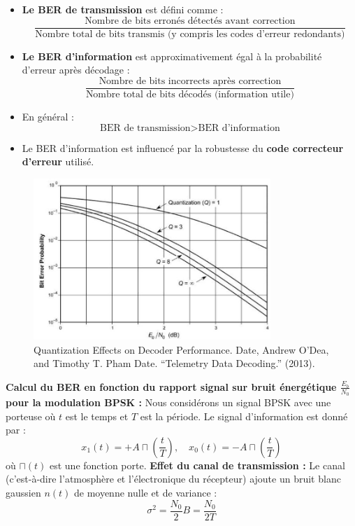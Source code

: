 \begin{itemize}
    \item \textbf{Le BER de transmission} est défini comme :
    \[
    \frac{\text{Nombre de bits erronés détectés avant correction}}{\text{Nombre total de bits transmis (y compris les codes d'erreur redondants)}}
    \]
    \item \textbf{Le BER d'information} est approximativement égal à la probabilité d'erreur après décodage :
    \[
    \frac{\text{Nombre de bits incorrects après correction}}{\text{Nombre total de bits décodés (information utile)}}
    \]
    \item En général :
    \[
    \text{BER de transmission} > \text{BER d'information}
    \]
    \item Le BER d'information est influencé par la robustesse du \textbf{code correcteur d'erreur} utilisé.
\end{itemize}
\begin{figure}[H] %
    \centering
    \includegraphics[width=0.8\textwidth]{figures/6-48.jpg}
    \caption{Quantization Effects on Decoder Performance. Date, Andrew O’Dea, and Timothy T. Pham Date. “Telemetry Data Decoding.” (2013).}
    \label{fig:communication2}
\end{figure}
\textbf{Calcul du BER en fonction du rapport signal sur bruit énergétique $\frac{E_b}{N_0}$ pour la modulation BPSK :}
Nous considérons un signal BPSK avec une porteuse où $t$ est le temps et $T$ est la période. Le signal d'information est donné par :
\[
x_1 (t) = + A \sqcap\left(\frac{t}{T} \right), \quad x_0 (t) = - A \sqcap\left(\frac{t}{T} \right)
\]
où $\sqcap(t)$ est une fonction porte.
\textbf{Effet du canal de transmission :}
Le canal (c'est-à-dire l’atmosphère et l’électronique du récepteur) ajoute un bruit blanc gaussien $n(t)$ de moyenne nulle et de variance :
\[
\sigma^2 = \frac{N_0}{2} B = \frac{N_0}{2T}
\]
